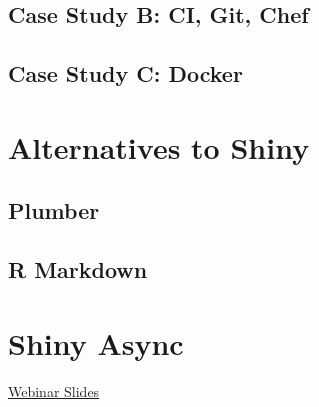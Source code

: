 \documentclass[]{book}
\begin{document}
\hypertarget{case-study-b-ci-git-chef}{%
\section{Case Study B: CI, Git, Chef}\label{case-study-b-ci-git-chef}}

\hypertarget{case-study-c-docker}{%
\section{Case Study C: Docker}\label{case-study-c-docker}}

\hypertarget{alternatives-to-shiny}{%
\chapter{Alternatives to Shiny}\label{alternatives-to-shiny}}

\hypertarget{plumber}{%
\section{Plumber}\label{plumber}}

\hypertarget{r-markdown}{%
\section{R Markdown}\label{r-markdown}}

\hypertarget{shiny-async}{%
\chapter{Shiny Async}\label{shiny-async}}

\href{https://github.com/rstudio/webinars/blob/master/56-scaling-shiny-apps/Scaling\%20Shiny\%20apps\%20with\%20async\%20programming.pdf}{Webinar
Slides}
\end{document}

